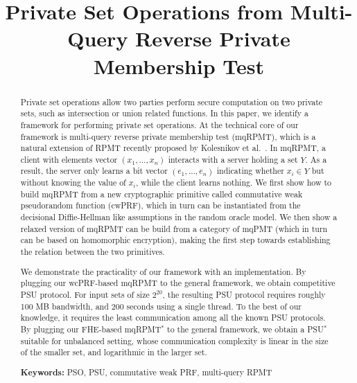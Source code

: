 \documentclass[a4paper,10pt]{article}
\begin{document}
\thispagestyle{empty}

\title{Private Set Operations from Multi-Query Reverse Private Membership Test}


\date{}

\maketitle

\begin{abstract}
Private set operations allow two parties perform secure computation on two private sets, 
such as intersection or union related functions. 
In this paper, we identify a framework for performing private set operations. 
At the technical core of our framework is multi-query reverse private membership test (mqRPMT), 
which is a natural extension of RPMT recently proposed by Kolesnikov et al.~\cite{KRTW-ASIACRYPT-2019}. 
In mqRPMT, a client with elements vector $(x_1, \dots, x_n)$ interacts with a server holding a set $Y$. 
As a result, the server only learns a bit vector $(e_1, \dots, e_n)$ indicating whether $x_i \in Y$ 
but without knowing the value of $x_i$, while the client learns nothing. 
We first show how to build mqRPMT from a new cryptographic primitive called 
commutative weak  pseudorandom function (cwPRF), 
which in turn can be instantiated from the decisional Diffie-Hellman like assumptions in the random oracle model. 
We then show a relaxed version of mqRPMT can be build from a category of mqPMT 
(which in turn can be based on homomorphic encryption), 
making the first step towards establishing the relation between the two primitives.    

We demonstrate the practicality of our framework with an implementation. 
By plugging our wcPRF-based mqRPMT to the general framework, 
we obtain competitive PSU protocol. 
For input sets of size $2^{20}$, the resulting PSU protocol requires roughly 100 MB bandwidth, 
and 200 seconds using a single thread. 
To the best of our knowledge, it requires the least communication among all the known PSU protocols. 
By plugging our FHE-based mqRPMT$^*$ to the general framework, 
we obtain a PSU$^*$ suitable for unbalanced setting, whose communication complexity is linear in the size of the smaller set, 
and logarithmic in the larger set.    
  
           
\begin{trivlist}
\item \textbf{Keywords:} PSO, PSU, commutative weak PRF, multi-query RPMT
\end{trivlist}
\end{abstract}
\end{document}
